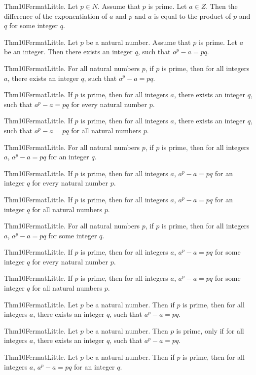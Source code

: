 \documentclass{article}
\begin{document}
Thm10FermatLittle. Let $p \in N$. Assume that $p$ is prime. Let $a \in Z$. Then the difference of the exponentiation of $a$ and $p$ and $a$ is equal to the product of $p$ and $q$ for some integer $q$.

Thm10FermatLittle. Let $p$ be a natural number. Assume that $p$ is prime. Let $a$ be an integer. Then there exists an integer $q$, such that $a ^ {p}- a = p q$.

Thm10FermatLittle. For all natural numbers $p$, if $p$ is prime, then for all integers $a$, there exists an integer $q$, such that $a ^ {p}- a = p q$.

Thm10FermatLittle. If $p$ is prime, then for all integers $a$, there exists an integer $q$, such that $a ^ {p}- a = p q$ for every natural number $p$.

Thm10FermatLittle. If $p$ is prime, then for all integers $a$, there exists an integer $q$, such that $a ^ {p}- a = p q$ for all natural numbers $p$.

Thm10FermatLittle. For all natural numbers $p$, if $p$ is prime, then for all integers $a$, $a ^ {p}- a = p q$ for an integer $q$.

Thm10FermatLittle. If $p$ is prime, then for all integers $a$, $a ^ {p}- a = p q$ for an integer $q$ for every natural number $p$.

Thm10FermatLittle. If $p$ is prime, then for all integers $a$, $a ^ {p}- a = p q$ for an integer $q$ for all natural numbers $p$.

Thm10FermatLittle. For all natural numbers $p$, if $p$ is prime, then for all integers $a$, $a ^ {p}- a = p q$ for some integer $q$.

Thm10FermatLittle. If $p$ is prime, then for all integers $a$, $a ^ {p}- a = p q$ for some integer $q$ for every natural number $p$.

Thm10FermatLittle. If $p$ is prime, then for all integers $a$, $a ^ {p}- a = p q$ for some integer $q$ for all natural numbers $p$.

Thm10FermatLittle. Let $p$ be a natural number. Then if $p$ is prime, then for all integers $a$, there exists an integer $q$, such that $a ^ {p}- a = p q$.

Thm10FermatLittle. Let $p$ be a natural number. Then $p$ is prime, only if for all integers $a$, there exists an integer $q$, such that $a ^ {p}- a = p q$.

Thm10FermatLittle. Let $p$ be a natural number. Then if $p$ is prime, then for all integers $a$, $a ^ {p}- a = p q$ for an integer $q$.
\end{document}
